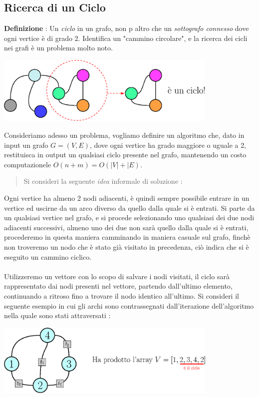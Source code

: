 \documentclass[12pt, letterpaper]{article}
\newcommand{\acc}{\\\hphantom{}\\}
\begin{document}
\subsection{Ricerca di un Ciclo}
\textbf{Definizione} : Un \textit{ciclo} in un grafo, non p altro che un \textit{sottografo connesso} dove
ogni vertice è di grado 2. Identifica un "cammino circolare", e la ricerca dei cicli nei grafi è un
problema molto noto.\begin{center}
    \includegraphics[width=0.8\textwidth ]{images/ciclo.eps}
\end{center}
Consideriamo adesso un problema, vogliamo definire un algoritmo che, dato in input un grafo \(G=(V,E)\), dove ogni
vertice ha grado maggiore o uguale a 2, restituisca in output un qualsiasi ciclo presente nel grafo, mantenendo
un costo computazionele $O(n+m)=O(|V|+|E)$.
\begin{quote}
    Si consideri la seguente \textit{idea} informale di soluzione : \end{quote}
Ogni vertice ha almeno 2 nodi adiacenti, è quindi sempre possibile entrare in un vertice ed uscirne da un
arco diverso da quello dalla quale si è entrati. Si parte da un qualsiasi vertice nel grafo, e si procede
selezionando uno qualsiasi dei due nodi adiacenti successivi, almeno uno dei due non sarà quello dalla
quale si è entrati, procederemo in questa maniera camminando in maniera casuale sul grafo, finchè non troveremo
un nodo che è stato già visitato in precedenza, ciò indica che si è eseguito un cammino ciclico.\acc
Utilizzeremo un vettore con lo scopo di salvare i nodi visitati, il ciclo sarà rappresentato
dai nodi presenti nel vettore, partendo dall'ultimo elemento, continuando a ritroso fino a trovare il nodo
identico all'ultimo. Si consideri il seguente esempio in cui gli archi sono contrassegnati dall'iterazione
dell'algoritmo nella quale sono stati attraversati :
\begin{center}
    \includegraphics[width=0.8\textwidth ]{images/algoCiclo.eps}
\end{center}
\end{document}
